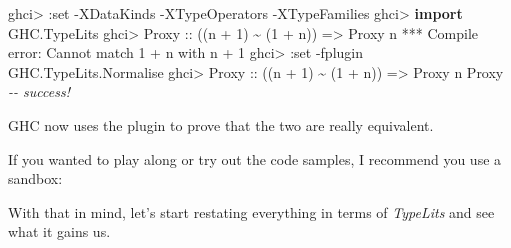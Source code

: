\documentclass[]{article}
\newenvironment{Shaded}{}{}
\newcommand{\CommentTok}[1]{\textcolor[rgb]{0.38,0.63,0.69}{\textit{#1}}}
\newcommand{\DataTypeTok}[1]{\textcolor[rgb]{0.56,0.13,0.00}{#1}}
\newcommand{\DecValTok}[1]{\textcolor[rgb]{0.25,0.63,0.44}{#1}}
\newcommand{\ExtensionTok}[1]{#1}
\newcommand{\FunctionTok}[1]{\textcolor[rgb]{0.02,0.16,0.49}{#1}}
\newcommand{\KeywordTok}[1]{\textcolor[rgb]{0.00,0.44,0.13}{\textbf{#1}}}
\newcommand{\NormalTok}[1]{#1}
\newcommand{\OperatorTok}[1]{\textcolor[rgb]{0.40,0.40,0.40}{#1}}
\newcommand{\OtherTok}[1]{\textcolor[rgb]{0.00,0.44,0.13}{#1}}
\begin{document}
\begin{Shaded}
\begin{Highlighting}[]
\NormalTok{ghci}\OperatorTok{>} \OperatorTok{:}\NormalTok{set }\OperatorTok{{-}}\DataTypeTok{XDataKinds} \OperatorTok{{-}}\DataTypeTok{XTypeOperators} \OperatorTok{{-}}\DataTypeTok{XTypeFamilies}
\NormalTok{ghci}\OperatorTok{>} \KeywordTok{import} \DataTypeTok{GHC.TypeLits}
\NormalTok{ghci}\OperatorTok{>} \DataTypeTok{Proxy}\OtherTok{ ::}\NormalTok{ ((n }\OperatorTok{+} \DecValTok{1}\NormalTok{) }\OperatorTok{\textasciitilde{}}\NormalTok{ (}\DecValTok{1} \OperatorTok{+}\NormalTok{ n)) }\OtherTok{=>} \DataTypeTok{Proxy}\NormalTok{ n}
\OperatorTok{***} \DataTypeTok{Compile} \FunctionTok{error}\OperatorTok{:} \DataTypeTok{Cannot}\NormalTok{ match }\OtherTok{\textasciigrave{}1 + n\textasciigrave{}}\NormalTok{ with }\OtherTok{\textasciigrave{}n + 1\textasciigrave{}}
\NormalTok{ghci}\OperatorTok{>} \OperatorTok{:}\NormalTok{set }\OperatorTok{{-}}\NormalTok{fplugin }\DataTypeTok{GHC.TypeLits.Normalise}
\NormalTok{ghci}\OperatorTok{>} \DataTypeTok{Proxy}\OtherTok{ ::}\NormalTok{ ((n }\OperatorTok{+} \DecValTok{1}\NormalTok{) }\OperatorTok{\textasciitilde{}}\NormalTok{ (}\DecValTok{1} \OperatorTok{+}\NormalTok{ n)) }\OtherTok{=>} \DataTypeTok{Proxy}\NormalTok{ n}
\DataTypeTok{Proxy}   \CommentTok{{-}{-} success!}
\end{Highlighting}
\end{Shaded}

GHC now uses the plugin to prove that the two are really equivalent.

If you wanted to play along or try out the code samples, I recommend you use a
sandbox:

\begin{Shaded}
\end{Shaded}

With that in mind, let's start restating everything in terms of \emph{TypeLits}
and see what it gains us.
\end{document}
